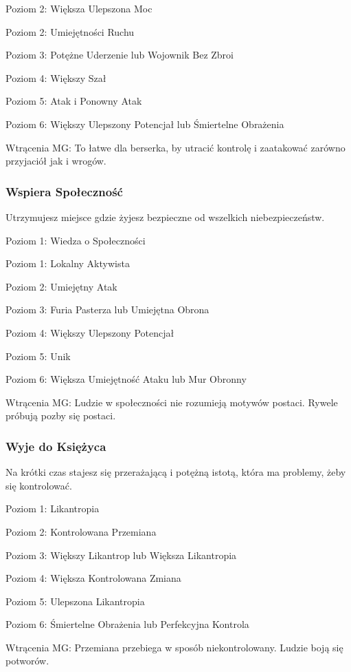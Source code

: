 Poziom 2: Większa Ulepszona Moc

Poziom 2: Umiejętności Ruchu

Poziom 3: Potężne Uderzenie lub Wojownik Bez Zbroi

Poziom 4: Większy Szał

Poziom 5: Atak i Ponowny Atak

Poziom 6: Większy Ulepszony Potencjał lub Śmiertelne Obrażenia

Wtrącenia MG: To łatwe dla berserka, by utracić kontrolę i zaatakować zarówno przyjaciół jak i wrogów.

\subsubsection{Wspiera Społeczność}

Utrzymujesz miejsce gdzie żyjesz bezpieczne od wszelkich niebezpieczeństw.

Poziom 1: Wiedza o Społeczności

Poziom 1: Lokalny Aktywista

Poziom 2: Umiejętny Atak

Poziom 3: Furia Pasterza lub Umiejętna Obrona

Poziom 4: Większy Ulepszony Potencjał

Poziom 5: Unik

Poziom 6: Większa Umiejętność Ataku lub Mur Obronny

Wtrącenia MG: Ludzie w społeczności nie rozumieją motywów postaci. Rywele próbują pozby się postaci.

\subsubsection{Wyje do Księżyca}

Na krótki czas stajesz się przerażającą i potężną istotą, która ma problemy, żeby się kontrolować. 

Poziom 1: Likantropia

Poziom 2: Kontrolowana Przemiana

Poziom 3: Większy Likantrop lub Większa Likantropia

Poziom 4: Większa Kontrolowana Zmiana

Poziom 5: Ulepszona Likantropia

Poziom 6: Śmiertelne Obrażenia lub Perfekcyjna Kontrola

Wtrącenia MG: Przemiana przebiega w sposób niekontrolowany. Ludzie boją się potworów. 

